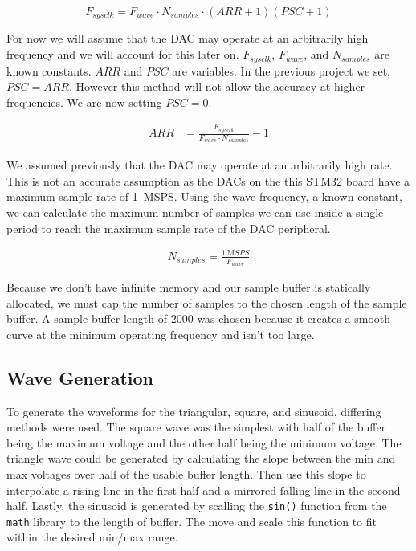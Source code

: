 \documentclass[CMPE]{KGCOEReport}
\def\code#1{\texttt{#1}}
\begin{document}
	\begin{equation}
	F_{sysclk} = F_{wave} \cdot N_{samples} \cdot (ARR + 1)(PSC + 1)
	\end{equation}

	For now we will assume that the DAC may operate at an arbitrarily high
	frequency and we will account for this later on. $F_{sysclk}$, $F_{wave}$,
	and $N_{samples}$ are known constants. $ARR$ and $PSC$ are variables. In the
	previous project we set, $PSC = ARR$. However this method will not allow the
	accuracy at higher frequencies. We are now setting $PSC=0$.

	\begin{align}
	ARR &= \frac{F_{sysclk}}{F_{wave} \cdot N_{samples}} - 1
	\end{align}

	We assumed previously that the DAC may operate at an arbitrarily high rate.
	This is not an accurate assumption as the DACs on the this STM32 board have
	a maximum sample rate of \SI{1}{\mega SPS}. Using the wave frequency, a known
	constant, we can calculate the maximum number of samples we can use inside
	a single period to reach the maximum sample rate of the DAC peripheral.

	\begin{align}
	N_{samples} = \frac{\SI{1}{\mega SPS}}{F_{wave}}
	\end{align}

	Because we don't have infinite memory and our sample buffer is statically
	allocated, we must cap the number of samples to the chosen length of the
	sample buffer. A sample buffer length of $2000$ was chosen because it
	creates a smooth curve at the minimum operating frequency and isn't too
	large.

	\subsection*{Wave Generation}

	To generate the waveforms for the triangular, square, and sinusoid, differing
	methods were used. The square wave was the simplest with half of the buffer
	being the maximum voltage and the other half being the minimum voltage. The
	triangle wave could be generated by calculating the slope between the min
	and max voltages over half of the usable buffer length. Then use this slope
	to interpolate a rising line in the first half and a mirrored falling line
	in the second half. Lastly, the sinusoid is generated by scalling the
	\code{sin()} function from the \code{math} library to the length of buffer.
	The move and scale this function to fit within the desired min/max range.
\end{document}
